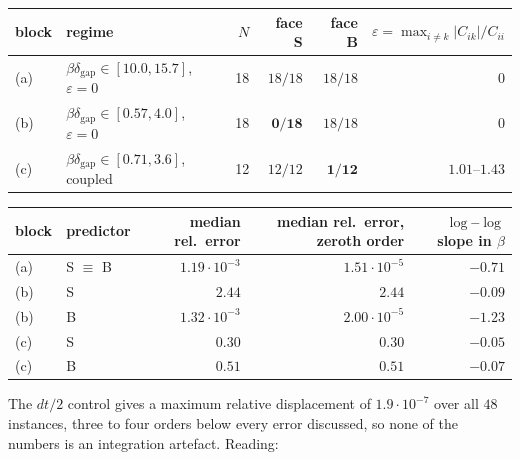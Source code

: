 \documentclass[11pt]{article}
\theoremstyle{remark}
\newcommand{\dgap}{\delta_{\mathrm{gap}}}
\begin{document}
\begin{center}
\begin{tabular}{@{}llrrrr@{}}
\toprule
block & regime & $N$ & face S & face B & $\varepsilon=\max_{i\ne k}|C_{ik}|/C_{ii}$\\
\midrule
(a) & $\beta\dgap\in[10.0,15.7]$, $\varepsilon=0$ & 18 & $18/18$ & $18/18$ & $0$\\
(b) & $\beta\dgap\in[0.57,4.0]$, $\varepsilon=0$  & 18 & $\mathbf{0/18}$ & $18/18$ & $0$\\
(c) & $\beta\dgap\in[0.71,3.6]$, coupled          & 12 & $12/12$ & $\mathbf{1/12}$ & $1.01$--$1.43$\\
\bottomrule
\end{tabular}
\end{center}

\begin{center}
\begin{tabular}{@{}llrrr@{}}
\toprule
block & predictor & median rel.\ error & median rel.\ error, zeroth order & $\log$--$\log$ slope in $\beta$\\
\midrule
(a) & S $\equiv$ B & $1.19\cdot10^{-3}$ & $1.51\cdot10^{-5}$ & $-0.71$\\
(b) & S & $2.44$ & $2.44$ & $-0.09$\\
(b) & B & $1.32\cdot10^{-3}$ & $2.00\cdot10^{-5}$ & $-1.23$\\
(c) & S & $0.30$ & $0.30$ & $-0.05$\\
(c) & B & $0.51$ & $0.51$ & $-0.07$\\
\bottomrule
\end{tabular}
\end{center}

\noindent
The $dt/2$ control gives a maximum relative displacement of $1.9\cdot10^{-7}$
over all $48$ instances, three to four orders below every error discussed, so
none of the numbers is an integration artefact. Reading:
\end{document}
